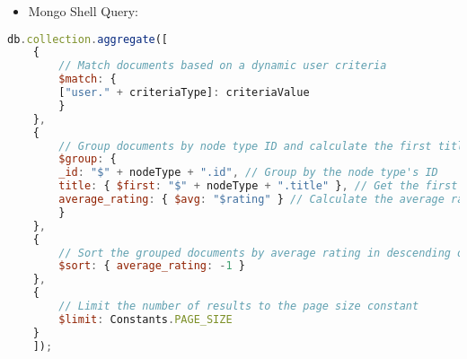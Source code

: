 \begin{itemize}
    \item Mongo Shell Query:
\end{itemize}
\begin{lstlisting}[language=JavaScript]
db.collection.aggregate([
    {
        // Match documents based on a dynamic user criteria
        $match: {
        ["user." + criteriaType]: criteriaValue
        }
    },
    {
        // Group documents by node type ID and calculate the first title and average rating
        $group: {
        _id: "$" + nodeType + ".id", // Group by the node type's ID
        title: { $first: "$" + nodeType + ".title" }, // Get the first title in the group
        average_rating: { $avg: "$rating" } // Calculate the average rating for the group
        }
    },
    {
        // Sort the grouped documents by average rating in descending order
        $sort: { average_rating: -1 }
    },
    {
        // Limit the number of results to the page size constant
        $limit: Constants.PAGE_SIZE
    }
    ]);
\end{lstlisting}



